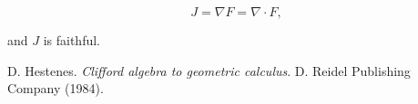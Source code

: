 \documentclass{article}
\begin{document}
\begin{equation}
  J = \nabla F = \nabla \cdot F,
\end{equation}

and $J$ is faithful.






  \begin{thebibliography}{9} 

      D. Hestenes.
      \emph{Clifford algebra to geometric calculus}.
      D. Reidel Publishing Company (1984).


  \end{thebibliography}
\end{document}
